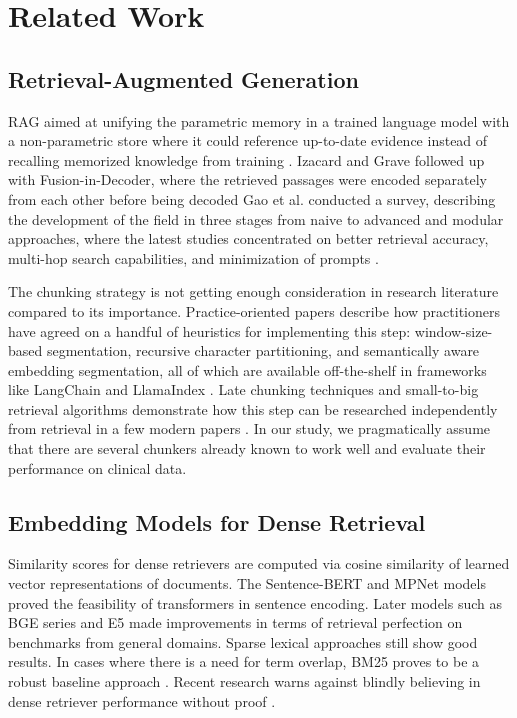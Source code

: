\documentclass[pdflatex,sn-mathphys-num]{sn-jnl}
\theoremstyle{thmstyleone}
\theoremstyle{thmstyletwo}
\theoremstyle{thmstylethree}
\begin{document}
\section{Related Work}\label{sec:related}

\subsection{Retrieval-Augmented Generation}

RAG aimed at unifying the parametric memory in a trained language model with a non-parametric store where it could reference up-to-date evidence instead of recalling memorized knowledge from training \cite{lewis2020rag}. Izacard and Grave followed up with Fusion-in-Decoder, where the retrieved passages were encoded separately from each other before being decoded \cite{izacard2021fid} Gao et al. conducted a survey, describing the development of the field in three stages from naive to advanced and modular approaches, where the latest studies concentrated on better retrieval accuracy, multi-hop search capabilities, and minimization of prompts \cite{gao2023ragsurvey}.

The chunking strategy is not getting enough consideration in research literature compared to its importance. Practice-oriented papers describe how practitioners have agreed on a handful of heuristics for implementing this step: window-size-based segmentation, recursive character partitioning, and semantically aware embedding segmentation, all of which are available off-the-shelf in frameworks like LangChain and LlamaIndex \cite{langchain2023,kamradt2023}. Late chunking techniques and small-to-big retrieval algorithms demonstrate how this step can be researched independently from retrieval in a few modern papers \cite{gunther2024late}. In our study, we pragmatically assume that there are several chunkers already known to work well and evaluate their performance on clinical data.

\subsection{Embedding Models for Dense Retrieval}

Similarity scores for dense retrievers are computed via cosine similarity of learned vector representations of documents. The Sentence-BERT \cite{reimers2019sbert} and MPNet \cite{song2020mpnet} models proved the feasibility of transformers in sentence encoding. Later models such as BGE series \cite{xiao2023bge,chen2024bgem3} and E5 \cite{wang2022e5} made improvements in terms of retrieval perfection on benchmarks from general domains. Sparse lexical approaches still show good results. In cases where there is a need for term overlap, BM25 proves to be a robust baseline approach \cite{robertson2009bm25}. Recent research warns against blindly believing in dense retriever performance without proof \cite{thakur2021beir}.
\end{document}
